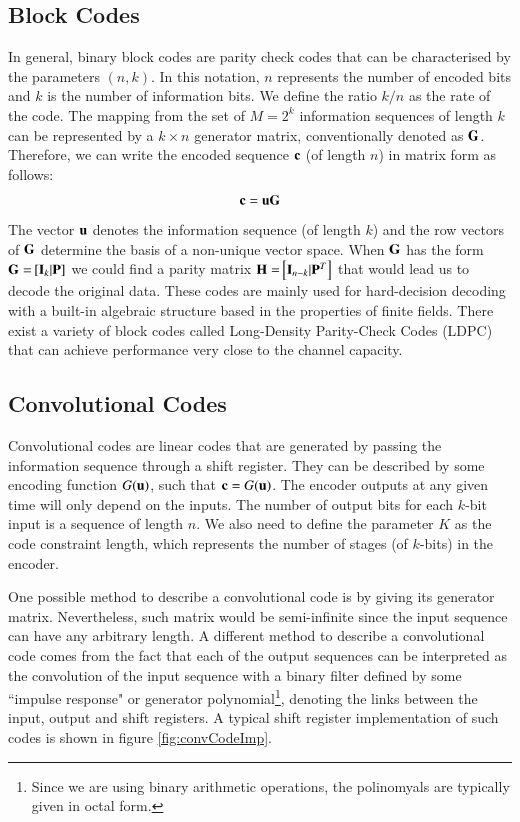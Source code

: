 \documentclass[12pt,a4paper,openright]{report}
\begin{document}
 
 \subsection{Block Codes} 
 In general, binary block codes  are parity check codes that can be characterised by the parameters $(n,k)$. In this notation, $n$ represents the number of encoded bits and $k$ is the number of information bits. We define the ratio $k/n$ as the rate of the code. The mapping from the set of $M=2^k$ information sequences of length $k$ can be represented by a $k\times n$ generator matrix, conventionally denoted as $\bf{G}$. Therefore, we can write the encoded sequence $\bf{c}$ (of length $n$) in matrix form as follows:
\begin{equation}
 {\bf{c}} ={{\bf{u}}}{\bf{G}}
 \end{equation}
The vector  $\bf{u}$ denotes the information sequence (of length $k$) and the row vectors of $\bf{G}$ determine the basis of a non-unique vector space. When $\bf{G}$ has the form ${\bf{G = }}\left[ {{{\bf{I}}_k}{\bf{|P}}} \right]$ we could find a parity matrix ${\bf{H = }}\left[ {{{\bf{I}}_{n - k}}{\bf{|}}{{\bf{P}}^T}} \right]$ that would lead us to decode the original data\cite{SklarBook}. These codes are mainly used for hard-decision decoding with a built-in algebraic structure based in the properties of finite fields. There exist a variety of block codes called Long-Density Parity-Check Codes (LDPC) that can achieve performance very close to the channel capacity.  


 \subsection{Convolutional Codes}
 Convolutional codes are linear codes that are generated by passing the information sequence through a shift register. They can be described by some encoding function $G({\bf{u}})$, such that ${\bf{c}}=G({\bf{u}})$. The encoder outputs at any given time will only depend on the inputs. The number of output bits for each $k$-bit input is a sequence of length $n$. We also need to define the parameter $K$ as the code constraint length, which represents the number of stages (of $k$-bits) in the encoder. 

One possible method to describe a convolutional code is by giving its generator matrix. Nevertheless, such matrix would be semi-infinite since the input sequence can have any arbitrary length\cite{Proakis}. A different method to describe a convolutional code comes from the fact that each of the output sequences can be interpreted as the convolution of the input sequence with a binary filter defined by some ``impulse response" or generator polynomial\footnote{Since we are using binary arithmetic operations, the polinomyals are typically given in octal form.}, denoting the links between the input, output and shift registers. A typical shift register implementation of such codes is shown in figure \ref{fig:convCodeImp}.
 
\end{document}

